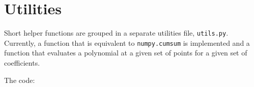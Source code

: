 \section{Utilities}
Short helper functions are grouped in a separate utilities file, \texttt{utils.py}. Currently, a function that is equivalent to \texttt{numpy.cumsum} 
is implemented and a function that evaluates a polynomial at a given set of points for a given set of coefficients.

\noindent The code:
